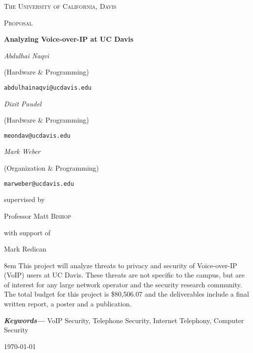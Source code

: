
\providecommand{\keywords}[1]{\textbf{\textit{Keywords---}} #1} 

\begin{titlepage}
	
	\centering
	{\scshape\LARGE The University of California, Davis \par}
	\vspace{1cm}
	{\scshape\Large Proposal\par}
	\vspace{1.5cm}
	{\huge\bfseries Analyzing Voice-over-IP at UC Davis\par}
	\vspace{1cm}
		{\Large\itshape Abdulhai Naqvi}\par
		(Hardware \& Programming)\par
	\texttt{abdulhainaqvi@ucdavis.edu}\par
	\vspace{1cm}
		{\Large\itshape Dixit Paudel}\par
		(Hardware \& Programming)\par
	\texttt{meondav@ucdavis.edu}\par
	\vspace{1cm}
		{\Large\itshape Mark Weber}\par
		(Organization \& Programming)\par
	\texttt{marweber@ucdavis.edu}\par
	\vspace{1.5cm}
	
	supervised by\par
  Professor Matt \textsc{Bishop}
	
	\vspace{1cm}
	
	with support of\par
	Mark Redican
	
	\vspace{1.5cm}

	\begingroup
	\leftskip8em
	\rightskip\leftskip
	This project will analyze threats to privacy and security of Voice-over-IP (VoIP) users at UC Davis. These threats are not specific to the campus, but are of interest for any large network operator and the security research community. The total budget for this project is \$80,506.07 and the deliverables include a final written report, a poster and a publication.
	\par
	\endgroup
	\vspace{1cm}

	
	\keywords{VoIP Security, Telephone Security, Internet Telephony, Computer Security}

	\vfill

	{\large \today\par}
\end{titlepage}

